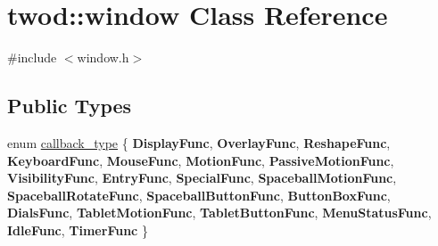 \hypertarget{classtwod_1_1window}{}\section{twod\+:\+:window Class Reference}
\label{classtwod_1_1window}


{\ttfamily \#include $<$window.\+h$>$}

\subsection*{Public Types}
\begin{DoxyCompactItemize}
\item 
enum \hyperlink{classtwod_1_1window_a3d6203e1119b54e35b4a08db799929da}{callback\+\_\+type} \{ \newline
{\bfseries Display\+Func}, 
{\bfseries Overlay\+Func}, 
{\bfseries Reshape\+Func}, 
{\bfseries Keyboard\+Func}, 
\newline
{\bfseries Mouse\+Func}, 
{\bfseries Motion\+Func}, 
{\bfseries Passive\+Motion\+Func}, 
{\bfseries Visibility\+Func}, 
\newline
{\bfseries Entry\+Func}, 
{\bfseries Special\+Func}, 
{\bfseries Spaceball\+Motion\+Func}, 
{\bfseries Spaceball\+Rotate\+Func}, 
\newline
{\bfseries Spaceball\+Button\+Func}, 
{\bfseries Button\+Box\+Func}, 
{\bfseries Dials\+Func}, 
{\bfseries Tablet\+Motion\+Func}, 
\newline
{\bfseries Tablet\+Button\+Func}, 
{\bfseries Menu\+Status\+Func}, 
{\bfseries Idle\+Func}, 
{\bfseries Timer\+Func}
 \}
\end{DoxyCompactItemize}
